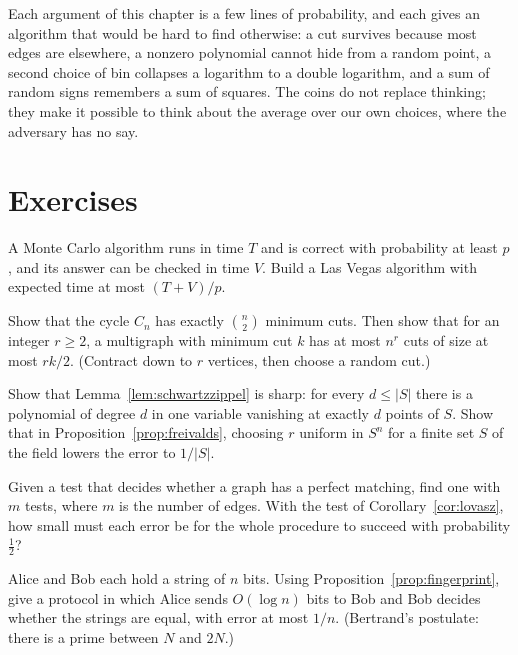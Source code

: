\begin{beauty}
Each argument of this chapter is a few lines of probability, and each gives an algorithm that would be hard to find otherwise: a cut survives because most edges are elsewhere, a nonzero polynomial cannot hide from a random point, a second choice of bin collapses a logarithm to a double logarithm, and a sum of random signs
remembers a sum of squares. The coins do not replace thinking; they make it possible to think about the average over our own choices, where the adversary has no say.
\end{beauty}

\section{Exercises}

\begin{exercise}[$\star$]\label{ex:lvmc}
A Monte Carlo algorithm runs in time $T$ and is correct with probability at least $p$, and its answer can be checked in time $V$. Build a Las Vegas algorithm with expected time at most $(T+V)/p$.
\end{exercise}

\begin{exercise}[$\star\star$]\label{ex:cutsalpha}
Show that the cycle $C_n$ has exactly $\binom n2$ minimum cuts. Then show that for an integer $r\ge2$, a multigraph with minimum cut $k$ has at most $n^r$ cuts of size at most $rk/2$. (Contract down to $r$ vertices, then choose a random cut.)
\end{exercise}

\begin{exercise}[$\star$]\label{ex:szsharp}
Show that Lemma~\ref{lem:schwartzzippel} is sharp: for every $d\le|S|$ there is a polynomial of degree $d$ in one variable vanishing at exactly $d$ points of $S$. Show that in Proposition~\ref{prop:freivalds}, choosing $r$ uniform in $S^n$ for a finite set $S$ of the field lowers the error to $1/|S|$.
\end{exercise}

\begin{exercise}[$\star\star$]\label{ex:tuttefind}
Given a test that decides whether a graph has a perfect matching, find one with $m$ tests, where $m$ is the number of edges. With the test of Corollary~\ref{cor:lovasz}, how small must each error be for the whole procedure to succeed with probability $\frac12$?
\end{exercise}

\begin{exercise}[$\star$]\label{ex:stringeq}
Alice and Bob each hold a string of $n$ bits. Using Proposition~\ref{prop:fingerprint}, give a protocol in which Alice sends $O(\log n)$ bits to Bob and Bob decides whether the strings are equal, with error at most $1/n$. (Bertrand's postulate: there is a prime between $N$ and $2N$.)
\end{exercise}

